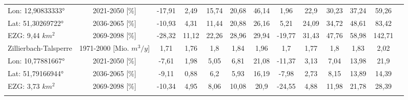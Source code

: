 \begin{longtable}{@{\extracolsep{\fill}}lc|ccccc||cccccc}
\cline{2-13} 
Lon: 12,90833333° & 2021-2050 [\%]  & -17,91 & 2,49 & 15,74 & 20,68 & 46,14 & 1,96 & 22,9 & 30,23 & 37,24 & 59,26 & \\ 
Lat: 51,30269722° & 2036-2065 [\%]  & -10,93 & 4,31 & 11,44 & 20,88 & 26,16 & 5,21 & 24,09 & 34,72 & 48,61 & 83,42 & \\ 
EZG: 9,44 $km^2$ & 2069-2098 [\%]  & -28,32 & 11,12 & 22,26 & 28,96 & 29,94 & -19,77 & 31,43 & 47,76 & 58,98 & 142,71 & \\ 
\hline 
Zillierbach-Talsperre & 1971-2000 [Mio. $m^3/y$]  & 1,71 & 1,76 & 1,8 & 1,84 & 1,96 & 1,7 & 1,77 & 1,8 & 1,83 & 2,02 & \\ 
\cline{2-13} 
Lon: 10,77881667° & 2021-2050 [\%]  & -7,61 & 1,98 & 5,05 & 6,81 & 21,08 & -11,37 & 3,13 & 7,04 & 13,98 & 21,9 & \\ 
Lat: 51,79166944° & 2036-2065 [\%]  & -9,11 & 0,88 & 6,2 & 5,93 & 16,19 & -7,98 & 2,73 & 8,15 & 13,89 & 14,39 & \\ 
EZG: 3,73 $km^2$ & 2069-2098 [\%]  & -10,34 & 4,95 & 8,06 & 10,08 & 20,9 & -24,55 & 4,88 & 11,98 & 21,78 & 28,39 & \\\hline
\label{Qrouted_daily_sum_Talsperrenforlatex_less50facc}
\end{longtable}
\addtolength{\tabcolsep}{5.9pt}
